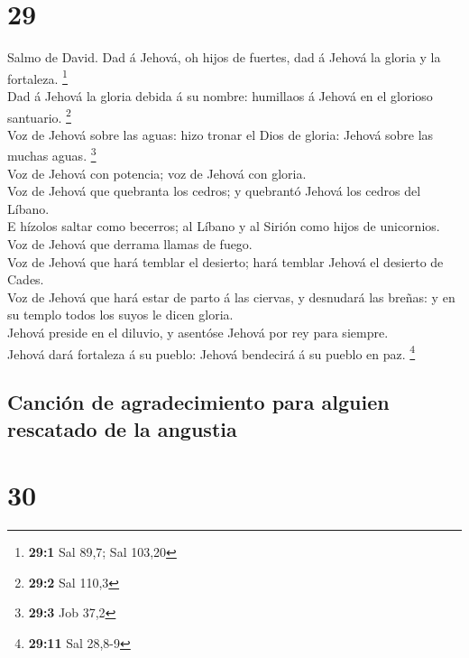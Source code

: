 \hypertarget{section-28}{%
\section{29}\label{section-28}}

 Salmo de David. Dad á Jehová, oh hijos de fuertes, dad á
Jehová la gloria y la fortaleza. \footnote{\textbf{29:1} Sal 89,7; Sal
  103,20}\\
 Dad á Jehová la gloria debida á su nombre: humillaos á
Jehová en el glorioso santuario. \footnote{\textbf{29:2} Sal 110,3}\\
 Voz de Jehová sobre las aguas: hizo tronar el Dios de
gloria: Jehová sobre las muchas aguas. \footnote{\textbf{29:3} Job 37,2}\\
 Voz de Jehová con potencia; voz de Jehová con gloria.\\
 Voz de Jehová que quebranta los cedros; y quebrantó Jehová
los cedros del Líbano.\\
 E hízolos saltar como becerros; al Líbano y al Sirión como
hijos de unicornios.\\
 Voz de Jehová que derrama llamas de fuego.\\
 Voz de Jehová que hará temblar el desierto; hará temblar
Jehová el desierto de Cades.\\
 Voz de Jehová que hará estar de parto á las ciervas, y
desnudará las breñas: y en su templo todos los suyos le dicen gloria.\\
 Jehová preside en el diluvio, y asentóse Jehová por rey
para siempre.\\
 Jehová dará fortaleza á su pueblo: Jehová bendecirá á su
pueblo en paz. \footnote{\textbf{29:11} Sal 28,8-9}

\hypertarget{canciuxf3n-de-agradecimiento-para-alguien-rescatado-de-la-angustia}{%
\subsection{Canción de agradecimiento para alguien rescatado de la
angustia}\label{canciuxf3n-de-agradecimiento-para-alguien-rescatado-de-la-angustia}}

\hypertarget{section-29}{%
\section{30}\label{section-29}}

